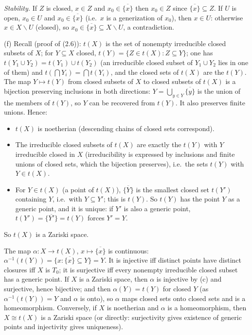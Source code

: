 \documentclass[11pt]{article}
\begin{document}
\emph{Stability.} If $Z$ is closed, $x\in Z$ and $x_0\in\overline{\{x\}}$ then $x_0\in Z$ since $\overline{\{x\}}\subseteq Z$. If $U$ is open, $x_0\in U$ and $x_0\in\overline{\{x\}}$ (i.e.\ $x$ is a generization of $x_0$), then $x\in U$: otherwise $x\in X\smallsetminus U$ (closed), so $x_0\in\overline{\{x\}}\subseteq X\smallsetminus U$, a contradiction.

(f) Recall (proof of (2.6)): $t(X)$ is the set of nonempty irreducible closed subsets of $X$; for $Y\subseteq X$ closed, $t(Y)=\{Z\in t(X):Z\subseteq Y\}$; one has $t(Y_1\cup Y_2)=t(Y_1)\cup t(Y_2)$ (an irreducible closed subset of $Y_1\cup Y_2$ lies in one of them) and $t(\bigcap Y_i)=\bigcap t(Y_i)$, and the closed sets of $t(X)$ are the $t(Y)$. The map $Y\mapsto t(Y)$ from closed subsets of $X$ to closed subsets of $t(X)$ is a bijection preserving inclusions in both directions: $Y=\bigcup_{y\in Y}\overline{\{y\}}$ is the union of the members of $t(Y)$, so $Y$ can be recovered from $t(Y)$. It also preserves finite unions. Hence:
\begin{itemize}
\item $t(X)$ is noetherian (descending chains of closed sets correspond).
\item The irreducible closed subsets of $t(X)$ are exactly the $t(Y)$ with $Y$ irreducible closed in $X$ (irreducibility is expressed by inclusions and finite unions of closed sets, which the bijection preserves), i.e.\ the sets $t(Y)$ with $Y\in t(X)$.
\item For $Y\in t(X)$ (a point of $t(X)$), $\overline{\{Y\}}$ is the smallest closed set $t(Y')$ containing $Y$, i.e.\ with $Y\subseteq Y'$; this is $t(Y)$. So $t(Y)$ has the point $Y$ as a generic point, and it is unique: if $Y'$ is also a generic point, $t(Y')=\overline{\{Y'\}}=t(Y)$ forces $Y'=Y$.
\end{itemize}
So $t(X)$ is a Zariski space.

The map $\alpha:X\to t(X)$, $x\mapsto\overline{\{x\}}$ is continuous: $\alpha^{-1}(t(Y))=\{x:\overline{\{x\}}\subseteq Y\}=Y$. It is injective iff distinct points have distinct closures iff $X$ is $T_0$; it is surjective iff every nonempty irreducible closed subset has a generic point. If $X$ is a Zariski space, then $\alpha$ is injective by (c) and surjective, hence bijective; and then $\alpha(Y)=t(Y)$ for closed $Y$ (as $\alpha^{-1}(t(Y))=Y$ and $\alpha$ is onto), so $\alpha$ maps closed sets onto closed sets and is a homeomorphism. Conversely, if $X$ is noetherian and $\alpha$ is a homeomorphism, then $X\cong t(X)$ is a Zariski space (or directly: surjectivity gives existence of generic points and injectivity gives uniqueness).
\end{document}
